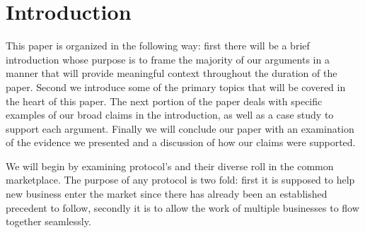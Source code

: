 \section{Introduction}

This paper is organized in the following way: first there will be a brief introduction whose purpose is to
frame the majority of our arguments in a manner that will provide meaningful context throughout the duration
of the paper. Second we introduce some of the primary topics that will be covered in the heart of this paper. 
The next portion of the paper deals with specific examples of our broad claims in the introduction, as well as 
a case study to support each argument. Finally we will conclude our paper with an examination of the evidence we
presented and a discussion of how our claims were supported. 


We will begin by examining protocol's and their diverse roll in the common marketplace. The purpose of any 
protocol is two fold: first it is supposed to help new business enter the market since there has already been an
established precedent to follow, secondly it is to allow the work of multiple businesses to flow together 
seamlessly. 
